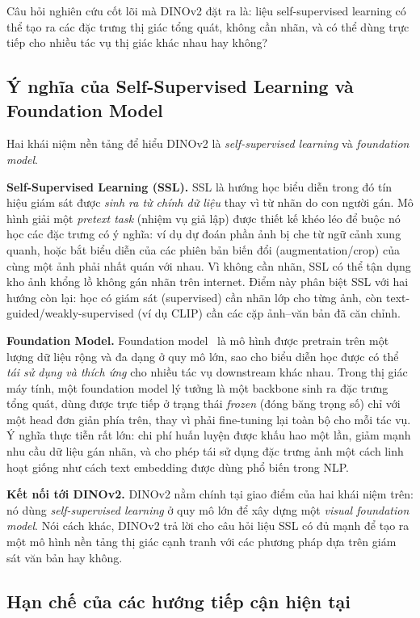 Câu hỏi nghiên cứu cốt lõi mà DINOv2 đặt ra là: liệu self-supervised learning có thể tạo ra các đặc trưng thị giác tổng quát, không cần nhãn, và có thể dùng trực tiếp cho nhiều tác vụ thị giác khác nhau hay không?

\subsection{Ý nghĩa của Self-Supervised Learning và Foundation Model}
Hai khái niệm nền tảng để hiểu DINOv2 là \emph{self-supervised learning} và \emph{foundation model}.

\textbf{Self-Supervised Learning (SSL).} SSL là hướng học biểu diễn trong đó tín hiệu giám sát được \emph{sinh ra từ chính dữ liệu} thay vì từ nhãn do con người gán. Mô hình giải một \emph{pretext task} (nhiệm vụ giả lập) được thiết kế khéo léo để buộc nó học các đặc trưng có ý nghĩa: ví dụ dự đoán phần ảnh bị che từ ngữ cảnh xung quanh, hoặc bắt biểu diễn của các phiên bản biến đổi (augmentation/crop) của cùng một ảnh phải nhất quán với nhau. Vì không cần nhãn, SSL có thể tận dụng kho ảnh khổng lồ không gán nhãn trên internet. Điểm này phân biệt SSL với hai hướng còn lại: học có giám sát (supervised) cần nhãn lớp cho từng ảnh, còn text-guided/weakly-supervised (ví dụ CLIP) cần các cặp ảnh--văn bản đã căn chỉnh.

\textbf{Foundation Model.} Foundation model~\cite{foundation} là mô hình được pretrain trên một lượng dữ liệu rộng và đa dạng ở quy mô lớn, sao cho biểu diễn học được có thể \emph{tái sử dụng và thích ứng} cho nhiều tác vụ downstream khác nhau. Trong thị giác máy tính, một foundation model lý tưởng là một backbone sinh ra đặc trưng tổng quát, dùng được trực tiếp ở trạng thái \emph{frozen} (đóng băng trọng số) chỉ với một head đơn giản phía trên, thay vì phải fine-tuning lại toàn bộ cho mỗi tác vụ. Ý nghĩa thực tiễn rất lớn: chi phí huấn luyện được khấu hao một lần, giảm mạnh nhu cầu dữ liệu gán nhãn, và cho phép tái sử dụng đặc trưng ảnh một cách linh hoạt giống như cách text embedding được dùng phổ biến trong NLP.

\textbf{Kết nối tới DINOv2.} DINOv2 nằm chính tại giao điểm của hai khái niệm trên: nó dùng \emph{self-supervised learning} ở quy mô lớn để xây dựng một \emph{visual foundation model}. Nói cách khác, DINOv2 trả lời cho câu hỏi liệu SSL có đủ mạnh để tạo ra một mô hình nền tảng thị giác cạnh tranh với các phương pháp dựa trên giám sát văn bản hay không.

\subsection{Hạn chế của các hướng tiếp cận hiện tại}
